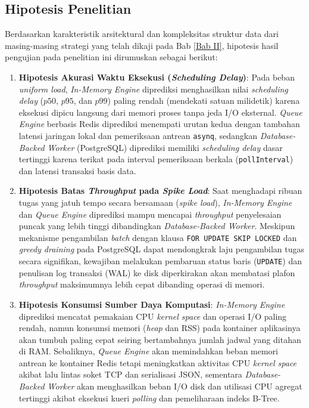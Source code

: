 \subsection{Hipotesis Penelitian} \label{III.Hipotesis}
Berdasarkan karakteristik arsitektural dan kompleksitas struktur data dari masing-masing strategi yang telah dikaji pada Bab \ref{Bab II}, hipotesis hasil pengujian pada penelitian ini dirumuskan sebagai berikut: \par
\begin{enumerate}[noitemsep]
	\item \textbf{Hipotesis Akurasi Waktu Eksekusi (\textit{Scheduling Delay})}: Pada beban \textit{uniform load}, \textit{In-Memory Engine} diprediksi menghasilkan nilai \textit{scheduling delay} ($p50$, $p95$, dan $p99$) paling rendah (mendekati satuan milidetik) karena eksekusi dipicu langsung dari memori proses tanpa jeda I/O eksternal. \textit{Queue Engine} berbasis Redis diprediksi menempati urutan kedua dengan tambahan latensi jaringan lokal dan pemeriksaan antrean \texttt{asynq}, sedangkan \textit{Database-Backed Worker} (PostgreSQL) diprediksi memiliki \textit{scheduling delay} dasar tertinggi karena terikat pada interval pemeriksaan berkala (\texttt{pollInterval}) dan latensi transaksi basis data.
	\item \textbf{Hipotesis Batas \textit{Throughput} pada \textit{Spike Load}}: Saat menghadapi ribuan tugas yang jatuh tempo secara bersamaan (\textit{spike load}), \textit{In-Memory Engine} dan \textit{Queue Engine} diprediksi mampu mencapai \textit{throughput} penyelesaian puncak yang lebih tinggi dibandingkan \textit{Database-Backed Worker}. Meskipun mekanisme pengambilan \textit{batch} dengan klausa \texttt{FOR UPDATE SKIP LOCKED} dan \textit{greedy draining} pada PostgreSQL dapat mendongkrak laju pengambilan tugas secara signifikan, kewajiban melakukan pembaruan status baris (\texttt{UPDATE}) dan penulisan log transaksi (WAL) ke disk diperkirakan akan membatasi plafon \textit{throughput} maksimumnya lebih cepat dibanding operasi di memori.
	\item \textbf{Hipotesis Konsumsi Sumber Daya Komputasi}: \textit{In-Memory Engine} diprediksi mencatat pemakaian CPU \textit{kernel space} dan operasi I/O paling rendah, namun konsumsi memori (\textit{heap} dan RSS) pada kontainer aplikasinya akan tumbuh paling cepat seiring bertambahnya jumlah jadwal yang ditahan di RAM. Sebaliknya, \textit{Queue Engine} akan memindahkan beban memori antrean ke kontainer Redis tetapi meningkatkan aktivitas CPU \textit{kernel space} akibat lalu lintas soket TCP dan serialisasi JSON, sementara \textit{Database-Backed Worker} akan menghasilkan beban I/O disk dan utilisasi CPU agregat tertinggi akibat eksekusi kueri \textit{polling} dan pemeliharaan indeks B-Tree.

\end{enumerate}
